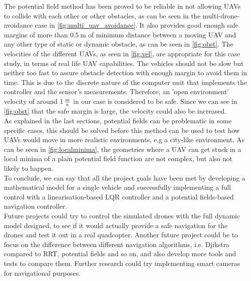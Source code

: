 \documentclass[journal, twoside]{IEEEtran}
\begin{document}
	The potential field method has been proved to be reliable in not allowing UAVs to collide with each other or other obstacles, as can be seen in the multi-drone-avoidance case in \figurename{ \ref{fig:multi_uav_avoidance}}. It also provides good enough safe margins of more than $\SI{0.5}{\meter}$ of minimum distance between a moving UAV and any other type of static or dynamic obstacle, as can be seen in \figurename{ \ref{fig:obst}}. The velocities of the different UAVs, as seen in \figurename{ \ref{fig:vel}}, are appropriate for this case study, in terms of real life UAV capabilities. The vehicles should not be slow but neither too fast to assure obstacle detection with enough margin to avoid them in time. This is due to the discrete nature of the computer unit that implements the controller and the sensor's measurements. Therefore, an 'open environment' velocity of around $\SI{1}{\frac{\meter}{\second}}$ in our case is considered to be safe. Since we can see in \figurename{ \ref{fig:obst}} that the safe margin is large, the velocity could also be increased. \\
	
	As explained in the last sections, potential fields can be problematic in some specific cases, this should be solved before this method can be used to test how UAVs would move in more realistic environments, e.g a city-like environment. As can be seen in \figurename{ \ref{fig:localminima}}, the geometries where a UAV can get stuck in a local minima of a plain potential field function are not complex, but also not likely to happen.\\
	
	To conclude, we can say that all the project goals have been met by developing a mathematical model for a single vehicle and successfully implementing a full control with a linearisation-based LQR controller and a potential fields-based navigation controller.\\

	Future projects could try to control the simulated drones with the full dynamic model designed, to see if it would actually provide a safe navigation for the drones and test it out in a real quadcopter. Another future project could be to focus on the difference between different navigation algorithms, i.e. Djikstra compared to RRT, potential fields and so on, and also develop more tools and tests to compare them. Further research could try implementing smart cameras for navigational purposes.
	
	
\end{document}
